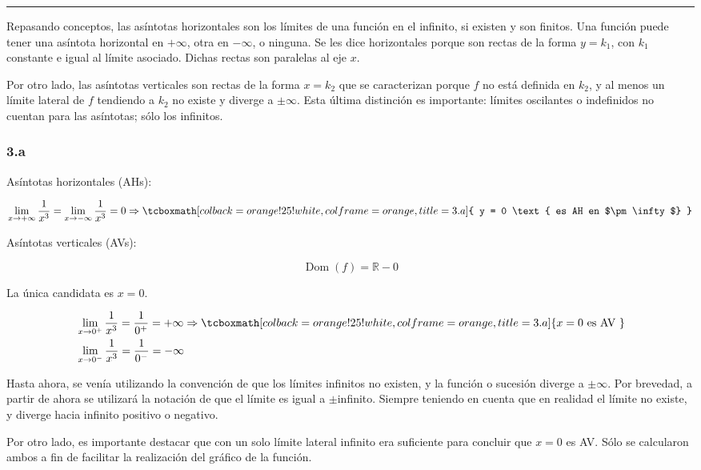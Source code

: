 \documentclass{article}
\newcommand{\hresult}[2]{\tcboxmath[colback=orange!25!white,colframe=orange, title=#1] {#2} }
\newcommand{\limxinf}{\lim_{x \rightarrow +\infty}}
\newcommand{\limxninf}{\lim_{x \rightarrow -\infty}}
\newcommand{\subsubsectionx}[1]{\subsubsection*{#1}\label{subsubsec:#1}\addcontentsline{toc}{subsubsection}{\nameref{subsubsec:#1}}}
\begin{document}
\hrule
\vspace{1em}

Repasando conceptos, las asíntotas horizontales son los límites de una función en el infinito, si existen y son finitos. Una función puede tener una asíntota horizontal en $ +\infty $, otra en $ -\infty $, o ninguna. Se les dice horizontales porque son rectas de la forma $ y = k_1 $, con $ k_1 $ constante e igual al límite asociado. Dichas rectas son paralelas al eje $ x $.

Por otro lado, las asíntotas verticales son rectas de la forma $ x = k_2 $ que se caracterizan porque $ f $ no está definida en $ k_2 $, y al menos un límite lateral de $ f $ tendiendo a $k_2$ no existe y diverge a $ \pm \infty $. Esta última distinción es importante: límites oscilantes o indefinidos no cuentan para las asíntotas; sólo los infinitos.

\subsubsectionx{3.a}

Asíntotas horizontales (AHs):

\begin{equation}
	\limxinf \frac{1}{x^3} = \limxninf \frac{1}{x^3} = 0 \Rightarrow \hresult{3.a}{ y = 0 \text{ es AH en $\pm \infty$}  }
\end{equation}

Asíntotas verticales (AVs): 

\begin{equation}
	\mathop{Dom}(f) = \mathbb{R} - 0
\end{equation}

La única candidata es $ x = 0 $.

\begin{subequations}
	\begin{align}
		& \lim_{x \rightarrow 0^{+}} \frac{1}{x^3} = \frac{1}{0^{+}} = +\infty \Rightarrow \hresult{3.a}{ x = 0 \text{ es AV } } \\
		& \lim_{x \rightarrow 0^{-}} \frac{1}{x^3} = \frac{1}{0^{-}} = -\infty
	\end{align}
\end{subequations}

Hasta ahora, se venía utilizando la convención de que los límites infinitos no existen, y la función o sucesión diverge a $ \pm \infty $. Por brevedad, a partir de ahora se utilizará la notación de que el límite es igual a $\pm$infinito. Siempre teniendo en cuenta que en realidad el límite no existe, y diverge hacia infinito positivo o negativo.

Por otro lado, es importante destacar que con un solo límite lateral infinito era suficiente para concluir que $ x = 0 $ es AV. Sólo se calcularon ambos a fin de facilitar la realización del gráfico de la función.
\end{document}
